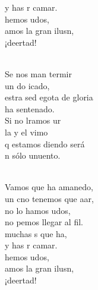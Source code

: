 \documentclass[12pt]{article}
\begin{document}
\begin{multicols*}{2}
\begin{cancion}
\begin{chorus}
	y has r camar.\\
	hemos udos,\\
	amos la gran ilusn, \\
	¡deertad!\\
	\end{chorus}%
	\jump\\
	Se nos man termir \\
	un do icado,\\
	estra sed egota de gloria\\
	 ha sentenado.\\
	Si no lramos ur\\
	la y el vimo\\
	q estamos diendo será\\
	n sólo unuento.\\\jump\\
	\begin{chorus}%
	Vamos que  ha amanedo,\\
	un cno tenemos que aar,\\
	no lo hamos udos,\\
	no pemos llegar al fil.\\
	 muchas s que ha,\\
	y has r camar.\\
	hemos udos,\\
	amos la gran ilusn, \\
	¡deertad!\\
	\end{chorus}%
	\jump\\
\end{cancion}%


\end{multicols*}
\end{document}
